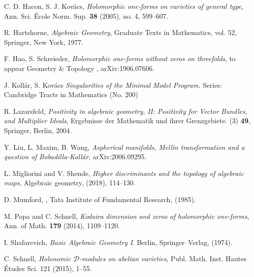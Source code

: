 \documentclass[a4paper,12pt,reqno]{amsart}
\theoremstyle{plain}
\theoremstyle{remark}
\begin{document}
\begin{thebibliography}{HKLR}
 C. D. Hacon, S. J. Kov\'acs, \textit{Holomorphic one-forms on varieties of general type}, Ann. Sci. \'Ecole Norm. Sup. \textbf{38} (2005), no. 4, 599--607.

 R. Hartshorne, \textit{Algebraic Geometry}, Graduate Texts in Mathematics, vol. 52, Springer, New York,
1977.

 F. Hao, S. Schreieder, \textit{Holomorphic one-forms without zeros on threefolds}, to appear Geometry $\&$ Topology , arXiv:1906.07606.

 J. Koll\'ar, S. Kov\'acs {\it Singularities of the Minimal Model Program.}
Series: Cambridge Tracts in Mathematics (No. 200)


 R. Lazarsfeld, \textit{Positivity in algebraic geometry, II: Positivity for Vector Bundles, and Multiplier Ideals}, Ergebnisse der Mathematik und ihrer Grenzgebiete. (3) \textbf{49}, Springer, Berlin, 2004.





 Y. Liu, L. Maxim, B. Wang, \textit{Aspherical manifolds, Mellin transformation and a question of Bobadilla-Koll\'ar}, arXiv:2006.09295.

 L. Migliorini and V. Shende, \textit{Higher discriminants and the topology of algebraic maps}, Algebraic geometry, (2018), 114--130.

 D. Mumford, , Tata Institute of Fundamental Research, (1985).

 M. Popa and C. Schnell, \textit{Kodaira dimension and zeros of holomorphic one-forms}, Ann. of Math. \textbf{179} (2014), 1109--1120.


 I. Shafarevich, \textit{Basic Algebraic Geometry I}. Berlin, Springer--Verlag, (1974).

C. Schnell, {\it  Holonomic $\mathcal{D}$-modules on abelian varieties},
Publ. Math. Inst. Hautes \'{E}tudes Sci. 121 (2015), 1--55.


\end{thebibliography}
\end{document}
